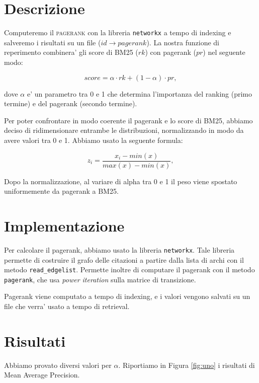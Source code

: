 \documentclass[12pt]{article}
\begin{document}
\maketitle

\section{Descrizione}
Computeremo il \textsc{pagerank} con la libreria \texttt{networkx} a tempo di indexing e salveremo i risultati su un file ($id \rightarrow pagerank$). La nostra funzione di reperimento combinera' gli score di BM25 ($rk$) con pagerank ($pr$) nel seguente modo:

\[ score =  \alpha \cdot rk + (1-\alpha) \cdot pr,\]

dove $\alpha$ e' un parametro tra 0 e 1 che determina l'importanza del ranking (primo termine) e del pagerank (secondo termine). 

Per poter confrontare in modo coerente il pagerank e lo score di BM25, abbiamo deciso di ridimensionare entrambe le distribuzioni, normalizzando in modo da avere valori tra 0 e 1. Abbiamo usato la seguente formula:

\[ z_i = \frac{x_i - min(x)}{max(x) - min(x)}, \]

Dopo la normalizzazione, al variare di alpha tra 0 e 1 il peso viene spostato uniformemente da pagerank a BM25.

\section{Implementazione}
Per calcolare il pagerank, abbiamo usato la libreria \texttt{networkx}. Tale libreria permette di costruire il grafo delle citazioni a partire dalla lista di archi con il metodo \texttt{read\_edgelist}. Permette inoltre di computare il pagerank con il metodo \texttt{pagerank}, che usa \textit{power iteration} sulla matrice di transizione.

Pagerank viene computato a tempo di indexing, e i valori vengono salvati su un file che verra' usato a tempo di retrieval.

\section{Risultati}
Abbiamo provato diversi valori per $\alpha$. Riportiamo in Figura \ref{fig:uno} i risultati di Mean Average Precision.
\end{document}
